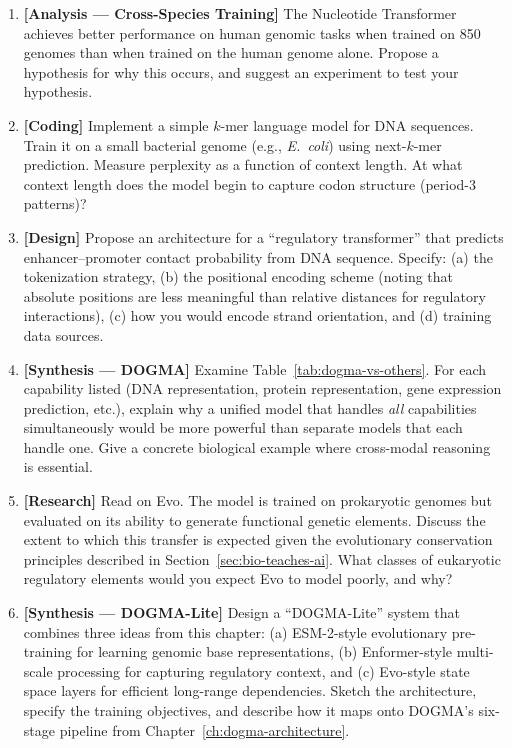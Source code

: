 \begin{enumerate}[label=\textbf{6.\arabic*.}, leftmargin=2.5em]
\item \textbf{[Analysis --- Cross-Species Training]} The Nucleotide Transformer achieves better performance on human genomic tasks when trained on 850 genomes than when trained on the human genome alone. Propose a hypothesis for why this occurs, and suggest an experiment to test your hypothesis.

\item \textbf{[Coding]} Implement a simple $k$-mer language model for DNA sequences. Train it on a small bacterial genome (e.g., \emph{E.~coli}) using next-$k$-mer prediction. Measure perplexity as a function of context length. At what context length does the model begin to capture codon structure (period-3 patterns)?

\item \textbf{[Design]} Propose an architecture for a ``regulatory transformer'' that predicts enhancer--promoter contact probability from DNA sequence. Specify: (a) the tokenization strategy, (b) the positional encoding scheme (noting that absolute positions are less meaningful than relative distances for regulatory interactions), (c) how you would encode strand orientation, and (d) training data sources.

\item \textbf{[Synthesis --- DOGMA]} Examine Table~\ref{tab:dogma-vs-others}. For each capability listed (DNA representation, protein representation, gene expression prediction, etc.), explain why a unified model that handles \emph{all} capabilities simultaneously would be more powerful than separate models that each handle one. Give a concrete biological example where cross-modal reasoning is essential.

\item \textbf{[Research]} Read \citet{nguyen2024} on Evo. The model is trained on prokaryotic genomes but evaluated on its ability to generate functional genetic elements. Discuss the extent to which this transfer is expected given the evolutionary conservation principles described in Section~\ref{sec:bio-teaches-ai}. What classes of eukaryotic regulatory elements would you expect Evo to model poorly, and why?

\item \textbf{[Synthesis --- DOGMA-Lite]} Design a ``DOGMA-Lite'' system that combines three ideas from this chapter: (a) ESM-2-style evolutionary pre-training for learning genomic base representations, (b) Enformer-style multi-scale processing for capturing regulatory context, and (c) Evo-style state space layers for efficient long-range dependencies. Sketch the architecture, specify the training objectives, and describe how it maps onto DOGMA's six-stage pipeline from Chapter~\ref{ch:dogma-architecture}.

\end{enumerate}


